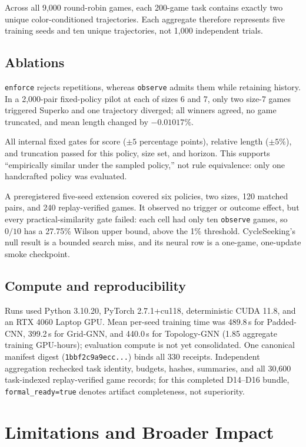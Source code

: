 \documentclass[10pt,letterpaper]{article}
\begin{document}
Across all 9,000 round-robin games, each 200-game task contains exactly two
unique color-conditioned trajectories. Each aggregate therefore represents
five training seeds and ten unique trajectories, not 1,000 independent trials.

\subsection{Ablations}

\texttt{enforce} rejects repetitions, whereas \texttt{observe} admits them
while retaining history. In a 2,000-pair fixed-policy pilot at each of sizes 6
and 7, only two size-7 games triggered Superko and one trajectory diverged; all
winners agreed, no game truncated, and mean length changed by $-0.01017\%$.

All internal fixed gates for score ($\pm 5$ percentage points), relative length
($\pm 5\%$), and truncation passed for this policy, size set, and horizon. This
supports ``empirically similar under the sampled policy,'' not rule equivalence:
only one handcrafted policy was evaluated.

A preregistered five-seed extension covered six policies, two sizes, 120
matched pairs, and 240 replay-verified games. It observed no trigger or outcome
effect, but every practical-similarity gate failed: each cell had only ten
\texttt{observe} games, so $0/10$ has a 27.75\% Wilson upper bound, above the
1\% threshold. CycleSeeking's null result is a bounded search miss, and its
neural row is a one-game, one-update smoke checkpoint.

\subsection{Compute and reproducibility}

Runs used Python 3.10.20, PyTorch 2.7.1+cu118, deterministic CUDA 11.8, and an
RTX 4060 Laptop GPU. Mean per-seed training time was 489.8\,s for
\mbox{Padded-CNN}, 399.2\,s for \mbox{Grid-GNN}, and 440.0\,s for
\mbox{Topology-GNN} (1.85 aggregate training GPU-hours);
evaluation compute is not yet consolidated. One canonical manifest digest
(\texttt{1bbf2c9a9ecc...}) binds all 330 receipts. Independent aggregation
rechecked task identity, budgets, hashes, summaries, and all 30,600
task-indexed replay-verified game records;
for this completed D14--D16 bundle,
\texttt{formal\_ready=true} denotes artifact completeness, not superiority.

\section{Limitations and Broader Impact}
\label{sec:limitations}
\end{document}

